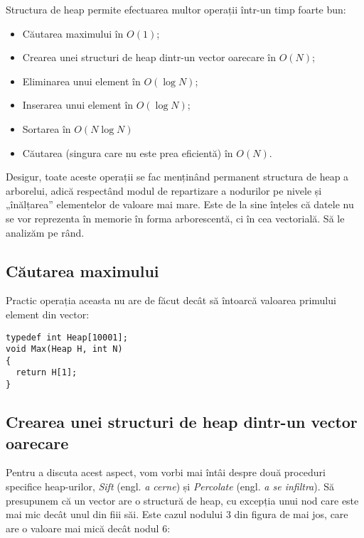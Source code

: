 Structura de heap permite efectuarea multor operații într-un timp foarte bun:

\begin{itemize}
  \item Căutarea maximului în $O(1)$;
  \item Crearea unei structuri de heap dintr-un vector oarecare în $O(N)$;
  \item Eliminarea unui element în $O(\log N)$;
  \item Inserarea unui element în $O(\log N)$;
  \item Sortarea în $O(N \log N)$
  \item Căutarea (singura care nu este prea eficientă) în $O(N)$.
\end{itemize}

Desigur, toate aceste operații se fac menținând permanent structura de heap a
arborelui, adică respectând modul de repartizare a nodurilor pe nivele și
„înălțarea” elementelor de valoare mai mare. Este de la sine înțeles că datele
nu se vor reprezenta în memorie în forma arborescentă, ci în cea
vectorială. Să le analizăm pe rând.

\subsection{Căutarea maximului}

Practic operația aceasta nu are de făcut decât să întoarcă valoarea primului
element din vector:

\begin{verbatim}
typedef int Heap[10001];
void Max(Heap H, int N)
{
  return H[1];
}
\end{verbatim}

\subsection{Crearea unei structuri de heap dintr-un vector oarecare}

Pentru a discuta acest aspect, vom vorbi mai întâi despre două proceduri
specifice heap-urilor, {\it Sift} (engl. {\it a cerne}) și {\it Percolate}
(engl. {\it a se infiltra}). Să presupunem că un vector are o structură de
heap, cu excepția unui nod care este mai mic decât unul din fiii săi. Este
cazul nodului 3 din figura de mai jos, care are o valoare mai mică decât nodul
6:


